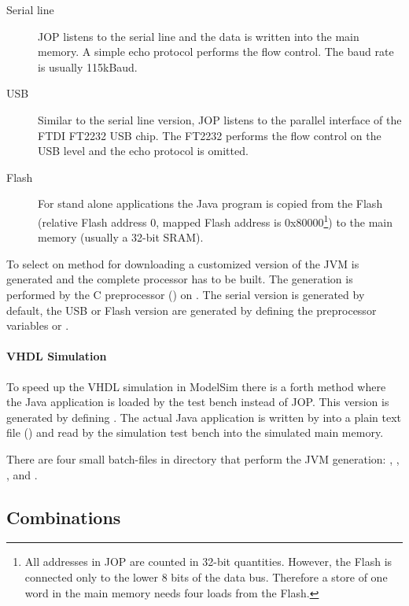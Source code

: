 \begin{description}
    \item[Serial line] JOP listens to the serial line and the data
    is written into the main memory. A simple echo protocol performs
    the flow control. The baud rate is usually 115kBaud.
    \item[USB] Similar to the serial line version, JOP listens to the
    parallel interface of the FTDI FT2232 USB chip. The FT2232
    performs the flow control on the USB level and the echo
    protocol is omitted.
    \item[Flash] For stand alone applications the Java program is
    copied from the Flash (relative Flash address 0, mapped Flash
    address is 0x80000\footnote{All addresses in JOP are counted in
    32-bit quantities. However, the Flash is connected only to the
    lower 8 bits of the data bus. Therefore a store of one word in
    the main memory needs four loads from the Flash.}) to the main
    memory (usually a 32-bit SRAM).
\end{description}


To select on method for downloading a customized version of the JVM
is generated and the complete processor has to be built. The
generation is performed by the C preprocessor () on
. The serial version is generated by default, the USB
or Flash version are generated by defining the preprocessor
variables  or .

\paragraph{VHDL Simulation}

To speed up the VHDL simulation in ModelSim
there is a forth method where the Java application is loaded by the
test bench instead of JOP. This version is generated by defining
. The actual Java application is written by
 into a plain text file () and read
by the simulation test bench into the simulated main memory.

There are four small batch-files in directory  that
perform the JVM generation: , ,
, and .

\subsection{Combinations}

